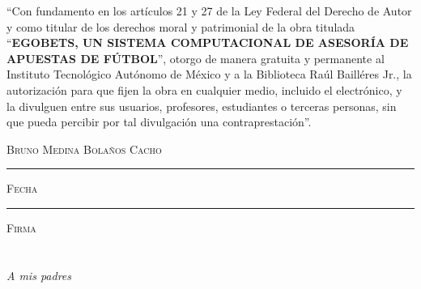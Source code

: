 
\thispagestyle{empty}
\vspace*{\fill}
\begingroup
``Con fundamento en los artículos 21 y 27 de la Ley Federal del Derecho de Autor y como titular de los derechos moral y patrimonial de la obra titulada ``\textbf{EGOBETS, UN SISTEMA COMPUTACIONAL DE ASESORÍA DE APUESTAS DE FÚTBOL}'', otorgo de manera gratuita y permanente al Instituto Tecnológico Autónomo de México y a la Biblioteca Raúl Bailléres Jr., la autorización para que fijen la obra en cualquier medio, incluido el electrónico, y la divulguen entre sus usuarios, profesores, estudiantes o terceras personas, sin que pueda percibir por tal divulgación una contraprestación''.

\centering

\hspace{3em}

\textsc{Bruno Medina Bolaños Cacho}

\vspace{5em}

\rule[1em]{20em}{0.5pt} %

\textsc{Fecha}
 
\vspace{8em}

\rule[1em]{20em}{0.5pt} %

\textsc{Firma}

\endgroup
\vspace*{\fill}


\pagestyle{empty}
\frontmatter

\chapter*{}
\begin{flushright}
\textit{A mis padres}
\end{flushright}



